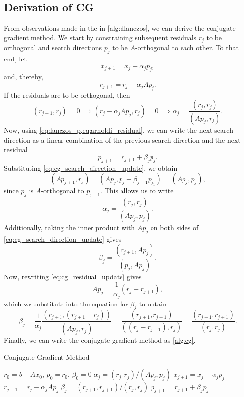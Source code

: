 \subsection{Derivation of CG}
From observations made in the in \cref{alg:dlanczos}, we can derive the conjugate gradient method. We start by constraining subsequent residuals $r_j$ to be orthogonal and search directions $p_j$ to be $A$-orthogonal to each other. To that end, let
\begin{equation}
  x_{j+1} = x_j + \alpha_j p_j,
  \label{eq:cg_solution_update}
\end{equation}
and, thereby,
\begin{equation}
  r_{j+1} = r_j - \alpha_j A p_j.
  \label{eq:cg_residual_update}
\end{equation}
If the residuals are to be orthogonal, then
\[
  (r_{j+1}, r_j) = 0 \implies (r_j - \alpha_j A p_j, r_j) = 0 \implies \alpha_j = \frac{(r_j, r_j)}{(A p_j, r_j)}.
\]
Now, using \cref{eq:lanczos_p,eq:arnoldi_residual}, we can write the next search direction as a linear combination of the previous search direction and the next residual
\begin{equation}
  p_{j+1} = r_{j+1} + \beta_j p_j.
  \label{eq:cg_search_direction_update}
\end{equation}
Substituting \cref{eq:cg_search_direction_update}, we obtain
\[
  (Ap_{j+1}, r_j) = (Ap_j, p_j -\beta_{j-1}p_{j_1}) = (Ap_j, p_j),
\]
since $p_j$ is $A$-orthogonal to $p_{j-1}$. This allows us to write
\begin{equation}
  \alpha_j = \frac{(r_j, r_j)}{(A p_j, p_j)}.
  \label{eq:cg_alpha}
\end{equation}
Additionally, taking the inner product with $A p_j$ on both sides of \cref{eq:cg_search_direction_update} gives
\[
  \beta_j = \frac{(r_{j+1}, A p_j)}{(p_j, A p_j)}.
\]
Now, rewriting \cref{eq:cg_residual_update} gives
\[
  Ap_j = \frac{1}{\alpha_j} (r_j - r_{j+1}),
\]
which we substitute into the equation for $\beta_j$ to obtain
\begin{equation}
  \beta_j = \frac{1}{\alpha_j}\frac{(r_{j+1}, (r_{j+1}-r_j))}{(Ap_j, r_j)} = \frac{(r_{j+1},r_{j+1})}{((r_j - r_{j-1}), r_j)} = \frac{(r_{j+1},r_{j+1})}{(r_j, r_j)}.
  \label{eq:cg_beta}
\end{equation}
Finally, we can write the conjugate gradient method as \cref{alg:cg}.
\begin{algorithm}[H]
  \caption{Conjugate Gradient Method \cite[Algorithm 6.18]{iter_method_saad}}
  \begin{algorithmic}
    \State $r_0 = b - Ax_0$, $p_0 = r_0$, $\beta_0 = 0$
    \State $\alpha_j = (r_j, r_j) / (A p_j, p_j)$
    \State $x_{j+1} = x_j + \alpha_j p_j$
    \State $r_{j+1} = r_j - \alpha_j A p_j$
    \State $\beta_j = (r_{j+1}, r_{j+1}) / (r_j, r_j)$
    \State $p_{j+1} = r_{j+1} + \beta_j p_j$
    \EndFor
  \end{algorithmic}
  \label{alg:cg}
\end{algorithm}

